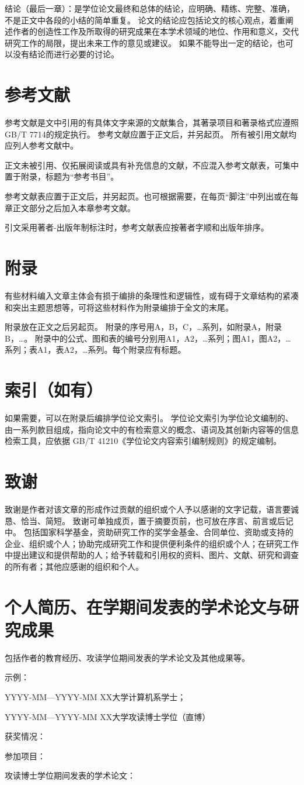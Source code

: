 结论（最后一章）：是学位论文最终和总体的结论，应明确、精练、完整、准确，不是正文中各段的小结的简单重复。
论文的结论应包括论文的核心观点，着重阐述作者的创造性工作及所取得的研究成果在本学术领域的地位、作用和意义，交代研究工作的局限，提出未来工作的意见或建议。
如果不能导出一定的结论，也可以没有结论而进行必要的讨论。

\section{参考文献}

参考文献是文中引用的有具体文字来源的文献集合，其著录项目和著录格式应遵照GB/T 7714的规定执行。
参考文献应置于正文后，并另起页。
所有被引用文献均应列人参考文献中。

正文未被引用、仅拓展阅读或具有补充信息的文献，不应混入参考文献表，可集中置于附录，标题为“参考书目”。

参考文献表应置于正文后，并另起页。也可根据需要，在每页“脚注”中列出或在每章正文部分之后加入本章参考文献。

引文采用著者-出版年制标注时，参考文献表应按著者字顺和出版年排序。

\section{附录}

有些材料编入文章主体会有损于编排的条理性和逻辑性，或有碍于文章结构的紧凑和突出主题思想等，可将这些材料作为附录编排于全文的末尾。

附录放在正文之后另起页。
附录的序号用A，B，C，…系列，如附录A，附录B，…。
附录中的公式、图和表的编号分别用A1，A2，…系列；图A1，图A2，…系列；表A1，表A2，…系列。每个附录应有标题。

\section{索引（如有）}

如果需要，可以在附录后编排学位论文索引。
学位论文索引为学位论文编制的、由一系列款目组成，指向论文中的有检索意义的概念、语词及其创新内容等的信息检索工具，应依据 GB/T 41210《学位论文内容索引编制规则》的规定编制。

\section{致谢}

致谢是作者对该文章的形成作过贡献的组织或个人予以感谢的文字记载，语言要诚恳、恰当、简短。
致谢可单独成页，置于摘要页前，也可放在序言、前言或后记中。
包括国家科学基金，资助研究工作的奖学金基金、合同单位、资助或支持的企业、组织或个人；协助完成研究工作和提供便利条件的组织或个人；在研究工作中提出建议和提供帮助的人；给予转载和引用权的资料、图片、文献、研究和调查的所有者；其他应感谢的组织和个人。

\section{个人简历、在学期间发表的学术论文与研究成果}

包括作者的教育经历、攻读学位期间发表的学术论文及其他成果等。

\noindent 示例：

{\centering
YYYY-MM—YYYY-MM XX大学计算机系学士；

YYYY-MM—YYYY-MM XX大学攻读博士学位（直博）

获奖情况：

参加项目：

攻读博士学位期间发表的学术论文：

}
